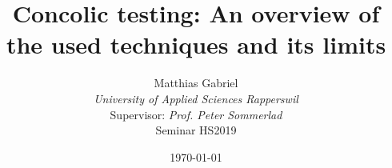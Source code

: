 \documentclass[journal]{IEEEtran}
\begin{document}
\title{Concolic testing: An overview of the used techniques and its limits}
\author{Matthias Gabriel\\\textit{University of Applied Sciences Rapperswil}\\[1cm]{\small Supervisor: \textit{Prof. Peter Sommerlad}\\Seminar HS2019}}
\date{\today}
\maketitle










\end{document}
